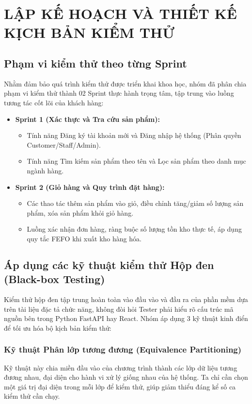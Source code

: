 \chapter{LẬP KẾ HOẠCH VÀ THIẾT KẾ KỊCH BẢN KIỂM THỬ}

\section{Phạm vi kiểm thử theo từng Sprint}
Nhằm đảm bảo quá trình kiểm thử được triển khai khoa học, nhóm đã phân chia phạm vi kiểm thử thành 02 Sprint thực hành trọng tâm, tập trung vào luồng tương tác cốt lõi của khách hàng:
\begin{itemize}
    \item \textbf{Sprint 1 (Xác thực và Tra cứu sản phẩm):}
    \begin{itemize}
        \item Tính năng Đăng ký tài khoản mới và Đăng nhập hệ thống (Phân quyền Customer/Staff/Admin).
        \item Tính năng Tìm kiếm sản phẩm theo tên và Lọc sản phẩm theo danh mục ngành hàng.
    \end{itemize}
    \item \textbf{Sprint 2 (Giỏ hàng và Quy trình đặt hàng):}
    \begin{itemize}
        \item Các thao tác thêm sản phẩm vào giỏ, điều chỉnh tăng/giảm số lượng sản phẩm, xóa sản phẩm khỏi giỏ hàng.
        \item Luồng xác nhận đơn hàng, ràng buộc số lượng tồn kho thực tế, áp dụng quy tắc FEFO khi xuất kho hàng hóa.
    \end{itemize}
\end{itemize}

\section{Áp dụng các kỹ thuật kiểm thử Hộp đen (Black-box Testing)}
Kiểm thử hộp đen tập trung hoàn toàn vào đầu vào và đầu ra của phần mềm dựa trên tài liệu đặc tả chức năng, không đòi hỏi Tester phải hiểu rõ cấu trúc mã nguồn bên trong Python FastAPI hay React. Nhóm áp dụng 3 kỹ thuật kinh điển để tối ưu hóa bộ kịch bản kiểm thử:

\subsection{Kỹ thuật Phân lớp tương đương (Equivalence Partitioning)}
Kỹ thuật này chia miền đầu vào của chương trình thành các lớp dữ liệu tương đương nhau, đại diện cho hành vi xử lý giống nhau của hệ thống. Ta chỉ cần chọn một giá trị đại diện trong mỗi lớp để kiểm thử, giúp giảm thiểu đáng kể số ca kiểm thử cần chạy.

